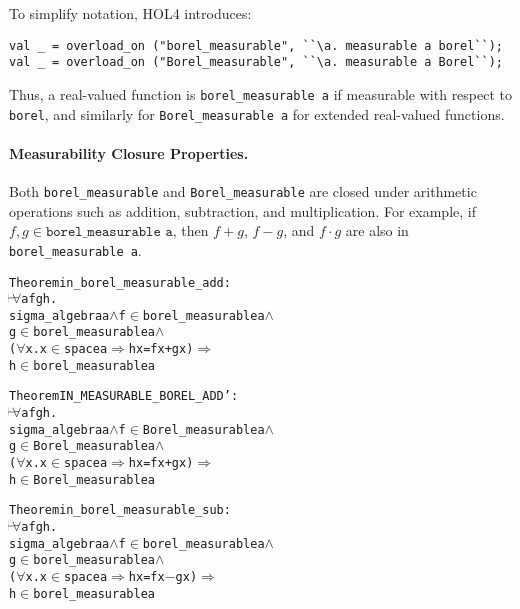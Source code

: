 To simplify notation, HOL4 introduces:
\begin{hol}
\begin{verbatim}
val _ = overload_on ("borel_measurable", ``\a. measurable a borel``);
val _ = overload_on ("Borel_measurable", ``\a. measurable a Borel``);
\end{verbatim}
\end{hol}

Thus, a real-valued function is \texttt{borel\_measurable a} if measurable with respect to \texttt{borel}, and similarly for \texttt{Borel\_measurable a} for extended real-valued functions.

\paragraph{Measurability Closure Properties.}
Both \texttt{borel\_measurable} and \texttt{Borel\_measurable} are closed under arithmetic operations such as addition, subtraction, and multiplication. For example, if $ f, g \in \texttt{borel\_measurable a} $, then $ f + g $, $ f - g $, and $ f \cdot g $ are also in \texttt{borel\_measurable a}.

\begin{hol}
\begin{alltt}
Theorem in\_borel\_measurable\_add :
\(\!\!\!{\turn}\!\!\!\!\) \(\forall\)a f g h.
sigma\_algebra a \(\land\) f \(\in\) borel\_measurable a \(\land\)
g \(\in\) borel\_measurable a \(\land\)
(\(\forall\)x. x \(\in\) space a \(\Rightarrow\) h x = f x + g x) \(\Rightarrow\)
h \(\in\) borel\_measurable a
\end{alltt}
\end{hol}

\begin{hol}
\begin{alltt}
Theorem IN\_MEASURABLE\_BOREL\_ADD' :
\(\!\!\!{\turn}\!\!\!\!\) \(\forall\)a f g h.
sigma\_algebra a \(\land\) f \(\in\) Borel\_measurable a \(\land\)
g \(\in\) Borel\_measurable a \(\land\)
(\(\forall\)x. x \(\in\) space a \(\Rightarrow\) h x = f x + g x) \(\Rightarrow\)
h \(\in\) Borel\_measurable a
\end{alltt}
\end{hol}

\begin{hol}
\begin{alltt}
Theorem in\_borel\_measurable\_sub :
\(\!\!\!{\turn}\!\!\!\!\) \(\forall\)a f g h.
sigma\_algebra a \(\land\) f \(\in\) borel\_measurable a \(\land\)
g \(\in\) borel\_measurable a \(\land\)
(\(\forall\)x. x \(\in\) space a \(\Rightarrow\) h x = f x \({-}\) g x) \(\Rightarrow\)
h \(\in\) borel\_measurable a
\end{alltt}
\end{hol}

